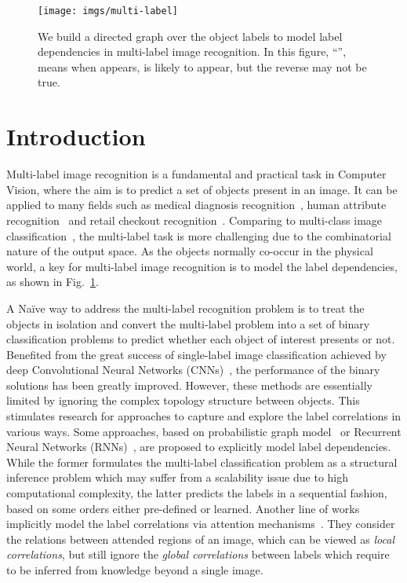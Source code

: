 \documentclass[10pt,twocolumn,letterpaper]{article}
\begin{document}
\begin{figure}
	\centering
	\texttt{[image: imgs/multi-label]}
	\caption{We build a directed graph over the object labels to model label dependencies in multi-label image recognition. In this figure, ``'', means when  appears,  is likely to appear, but the reverse may not be true.}
	\label{fig:multi}
\end{figure}




\section{Introduction}\label{sec:intro}

Multi-label image recognition is a fundamental and practical task in Computer Vision, where the aim is to predict a set of objects present in an image. It can be applied to many fields such as medical diagnosis recognition~\cite{chest}, human attribute recognition~\cite{human} and retail checkout recognition~\cite{retail,rpc}. Comparing to multi-class image classification~\cite{7812753}, the multi-label task is more challenging due to the combinatorial nature of the output space. As the objects normally co-occur in the physical world, a key for multi-label image recognition is to model the label dependencies, as shown in Fig.~\ref{fig:multi}.

A Na\"ive way to address the multi-label recognition problem is to treat the objects in isolation and convert the multi-label problem into a set of binary classification problems to predict whether each object of interest presents or not. Benefited from the great success of  single-label image classification achieved by deep Convolutional Neural Networks (CNNs)~\cite{resnet,verydeep,inception,densenet}, the performance of the binary solutions has been greatly improved. However, these methods are essentially limited by ignoring the complex topology structure between objects. This stimulates research for approaches to capture and explore the label correlations in various ways. Some approaches, based on probabilistic graph model~\cite{tree,conditional} or Recurrent Neural Networks (RNNs)~\cite{cnn-rnn}, are proposed to explicitly model label dependencies. While the former formulates the multi-label classification problem as a structural inference problem which may suffer from a scalability issue due to high computational complexity, the latter predicts the labels in a sequential fashion, based on some orders either pre-defined or learned. Another line of works implicitly model the label correlations via attention mechanisms~\cite{srn,rnn_attention}. They consider the relations between attended regions of an image, which can be viewed as \emph{local correlations}, but still ignore the \emph{global correlations} between labels which require to be inferred from knowledge beyond a single image.   
 
\end{document}
